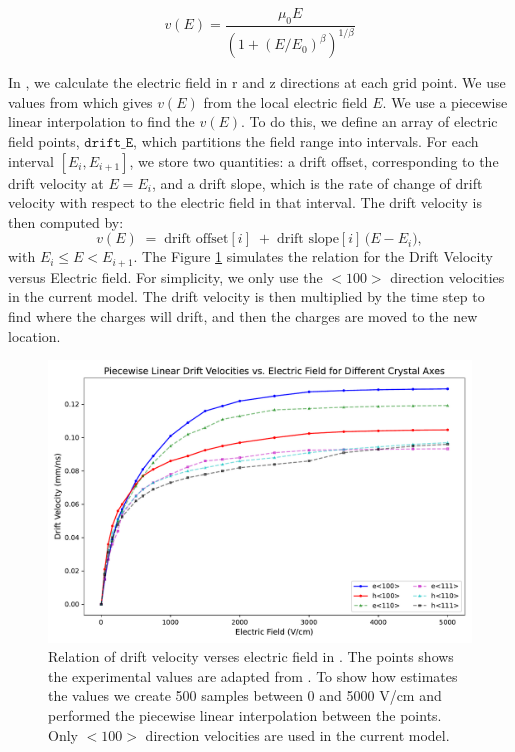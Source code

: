 \begin{equation}
v(E) = \frac{\mu_0 E}{(1 + (E/E_0)^\beta)^{1/\beta}}
\end{equation}

In {\ehd}, we calculate the electric field in r and z directions at each grid point. We use values from \cite{OMAR19871351} which gives $v(E)$ from the local electric field $E$. We use a piecewise linear interpolation to find the $v(E)$. To do this, we define an array of electric field points, $\texttt{drift\_E}$, which partitions the field range into intervals. For each interval $[E_i, E_{i+1}]$, we store two quantities: a drift offset, corresponding to the drift velocity at $E = E_i$, and a drift slope, which is the rate of change of drift velocity with respect to the electric field in that interval. The drift velocity is then
computed by:
\[
v(E) \;=\; \text{drift offset}[i]
\;+\; \text{drift slope}[i] \,\bigl( E - E_i \bigr),
\]
with $E_i \le E < E_{i+1}$. The Figure \ref{ch3:fig:dv_vs_e} simulates the relation for the Drift Velocity versus Electric field.  For simplicity, we only use the $<100>$ direction velocities in the current model. The drift velocity is then multiplied by the time step to find where the charges will drift, and then the charges are moved to the new location.

\begin{figure}[!htb]
    \includegraphics[trim={0cm 0 0cm 0},clip,width=0.99\linewidth]{ch3/figs/ehd_dv_e.pdf}
    \caption{Relation of drift velocity verses electric field in {\ehd}. The points shows the experimental values are adapted from \cite{OMAR19871351}. To show how {\ehd} estimates the values we create 500 samples between 0 and 5000 V/cm and performed the piecewise linear interpolation between the points. Only $<100>$ direction velocities are used in the current model.}
    \label{ch3:fig:dv_vs_e}
\end{figure}


